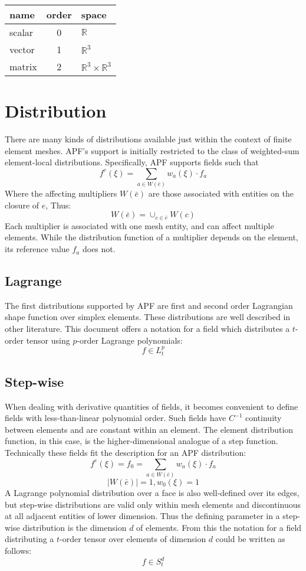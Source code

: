 \documentclass{article}
\begin{document}
\begin{center}
\begin{tabular}{lcl}
name & order & space \\ \hline
scalar & 0 & $\mathbb{R}$ \\
vector & 1 & $\mathbb{R}^3$ \\
matrix & 2 & $\mathbb{R}^3\times \mathbb{R}^3$ \\
\end{tabular}
\end{center}

\section{Distribution}
There are many kinds of distributions available just within the context of
finite element meshes.
APF's support is initially restricted to the class of weighted-sum
element-local distributions.
Specifically, APF supports fields such that
\[f^e(\xi) = \sum_{a\in W(\bar{e})} w_a(\xi)\cdot f_a\]
Where the affecting multipliers $W(\bar{e})$ are those associated with
entities on the closure of $e$, Thus:
\[W(\bar{e})=\cup_{c\in \bar{e}} W(c)\]
Each multiplier is associated with one mesh entity, and can affect
multiple elements.
While the distribution function of a multiplier depends on the element,
its reference value $f_a$ does not.

\subsection{Lagrange}
The first distributions supported by APF are first and second
order Lagrangian shape function over simplex elements.
These distributions are well described in other literature.
This document offers a notation for a field which distributes
a $t$-order tensor using $p$-order Lagrange polynomials:
\[f\in L^p_t\]

\subsection{Step-wise}
When dealing with derivative quantities of fields, it becomes
convenient to define fields with less-than-linear polynomial order.
Such fields have $C^{-1}$ continuity between elements and are constant
within an element.
The element distribution function, in this case, is the higher-dimensional
analogue of a step function.
Technically these fields fit the description for an APF distribution:
\[f^e(\xi)=f_0=\sum_{a\in W(\bar{e})} w_a(\xi)\cdot f_a\]
\[|W(\bar{e})|=1, w_0(\xi)=1\]
A Lagrange polynomial distribution over a face is also well-defined
over its edges, but step-wise distributions are valid only within
mesh elements and discontinuous at all adjacent entities of lower
dimension.
Thus the defining parameter in a step-wise distribution is the
dimension $d$ of elements.
From this the notation for a field distributing a $t$-order
tensor over elements of dimension $d$ could be written as follows:
\[f\in S^d_t\]
\end{document}
